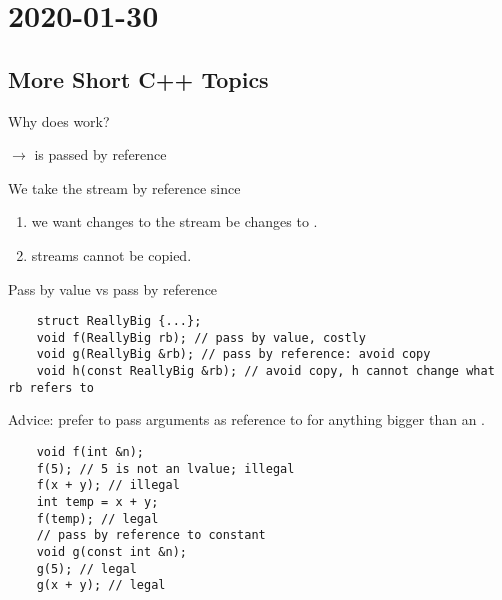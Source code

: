 \section{2020-01-30}
\subsection{More Short C++ Topics}
Why does  work?

 $ \rightarrow $  is passed by reference


We take the stream by reference since
\begin{enumerate}
      \item we want changes to the stream be changes to .
      \item streams cannot be copied.
\end{enumerate}
Pass by value vs pass by reference
\begin{lstlisting}
    struct ReallyBig {...};
    void f(ReallyBig rb); // pass by value, costly
    void g(ReallyBig &rb); // pass by reference: avoid copy
    void h(const ReallyBig &rb); // avoid copy, h cannot change what rb refers to
\end{lstlisting}
Advice: prefer to pass arguments as reference to  for anything bigger
than an .
\begin{lstlisting}
    void f(int &n);
    f(5); // 5 is not an lvalue; illegal
    f(x + y); // illegal
    int temp = x + y;
    f(temp); // legal
    // pass by reference to constant
    void g(const int &n);
    g(5); // legal
    g(x + y); // legal
\end{lstlisting}
